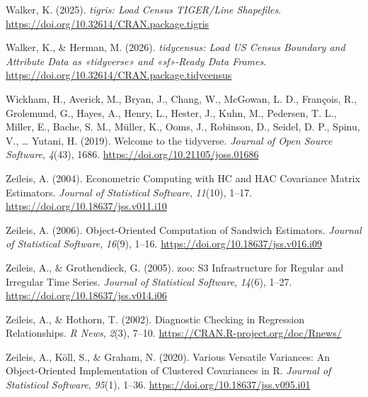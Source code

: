 \documentclass[
  norsk,
  a4paper,
]{article}
\newlength{\cslhangindent}
\newenvironment{CSLReferences}[2] %
 {\begin{list}{}{%
  \setlength{\itemindent}{0pt}
  \setlength{\leftmargin}{0pt}
  \setlength{\parsep}{0pt}
  \ifodd #1
   \setlength{\leftmargin}{\cslhangindent}
   \setlength{\itemindent}{-1\cslhangindent}
  \fi
  \setlength{\itemsep}{#2\baselineskip}}}
 {\end{list}}
\begin{document}
\begin{CSLReferences}{1}{0}
Walker, K. (2025). \emph{{tigris}: Load Census TIGER/Line Shapefiles}.
\url{https://doi.org/10.32614/CRAN.package.tigris}

Walker, K., \& Herman, M. (2026). \emph{{tidycensus}: Load US Census
Boundary and Attribute Data as {«{tidyverse}»} and {«{sf}»}-Ready Data
Frames}. \url{https://doi.org/10.32614/CRAN.package.tidycensus}

Wickham, H., Averick, M., Bryan, J., Chang, W., McGowan, L. D.,
François, R., Grolemund, G., Hayes, A., Henry, L., Hester, J., Kuhn, M.,
Pedersen, T. L., Miller, E., Bache, S. M., Müller, K., Ooms, J.,
Robinson, D., Seidel, D. P., Spinu, V., \ldots{} Yutani, H. (2019).
Welcome to the {tidyverse}. \emph{Journal of Open Source Software},
\emph{4}(43), 1686. \url{https://doi.org/10.21105/joss.01686}

Zeileis, A. (2004). Econometric Computing with {HC} and {HAC} Covariance
Matrix Estimators. \emph{Journal of Statistical Software},
\emph{11}(10), 1--17. \url{https://doi.org/10.18637/jss.v011.i10}

Zeileis, A. (2006). Object-Oriented Computation of Sandwich Estimators.
\emph{Journal of Statistical Software}, \emph{16}(9), 1--16.
\url{https://doi.org/10.18637/jss.v016.i09}

Zeileis, A., \& Grothendieck, G. (2005). {zoo}: S3 Infrastructure for
Regular and Irregular Time Series. \emph{Journal of Statistical
Software}, \emph{14}(6), 1--27.
\url{https://doi.org/10.18637/jss.v014.i06}

Zeileis, A., \& Hothorn, T. (2002). Diagnostic Checking in Regression
Relationships. \emph{R News}, \emph{2}(3), 7--10.
\url{https://CRAN.R-project.org/doc/Rnews/}

Zeileis, A., Köll, S., \& Graham, N. (2020). Various Versatile
Variances: An Object-Oriented Implementation of Clustered Covariances in
{R}. \emph{Journal of Statistical Software}, \emph{95}(1), 1--36.
\url{https://doi.org/10.18637/jss.v095.i01}

\end{CSLReferences}
\end{document}
